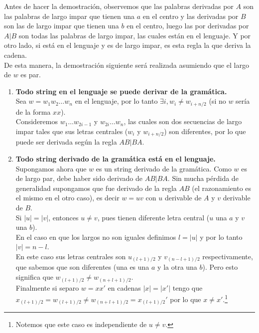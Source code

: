 \documentclass[dcc]{fcfmcourse}
\begin{document}
\begin{problems}
\begin{enumerate}[a)]
Antes de hacer la demostración, observemos que las palabras derivadas por $A$ son las palabras de largo impar que tienen una $a$ en el centro y las derivadas por $B$ son las de largo impar que tienen una $b$ en el centro, luego las por derivadas por $A|B$ son todas las palabras de largo impar, las cuales están en el lenguaje. Y por otro lado, si está en el lenguaje y es de largo impar, es esta regla la que deriva la cadena.\\
De esta manera, la demostración siguiente será realizada asumiendo que el largo de $w$ es par.\\
\begin{enumerate}[1.]
\item \textbf{Todo string en el lenguaje se puede derivar de la gramática.}\\
Sea $w = w_{1}w_{2}\ldots w_{n}$ en el lenguaje, por lo tanto $\exists i, w_{i} \not = w_{i+n/2}$ (si no $w$ sería de la forma $xx$).\\
Consideremos $w_{1}\ldots w_{2i-1}$ y $w_{2i}\ldots w_{n}$, las cuales son dos secuencias de largo impar tales que sus letras centrales ($w_{i}$ y $w_{i+n/2}$) son diferentes, por lo que puede ser derivada según la regla $AB|BA$.
\item \textbf{Todo string derivado de la gramática está en el lenguaje.}\\
Supongamos ahora que $w$ es un string derivado de la gramática. Como $w$ es de largo par, debe haber sido derivado de $AB|BA$. Sin mucha pérdida de generalidad supongamos que fue derivado de la regla $AB$ (el razonamiento es el mismo en el otro caso), es decir $w=uv$ con $u$ derivable de $A$ y $v$ derivable de $B$.\\

Si $|u|=|v|$, entonces $u \not = v$, pues tienen diferente letra central ($u$ una $a$ y $v$ una $b$).\\
En el caso en que los largos no son iguales definimos $l=|u|$ y por lo tanto $|v| = n-l$.\\
En este caso sus letras centrales son $u_{(l+1)/2}$ y $v_{(n-l+1)/2}$ respectivamente, que sabemos que son diferentes (una es una $a$ y la otra una $b$). Pero esto significa que $w_{(l+1)/2} \not = w_{(n+l+1)/2}$.\\
Finalmente si separo $w = xx'$ en cadenas $|x|=|x'|$ tengo que $x_{(l+1)/2} = w_{(l+1)/2} \not = w_{(n+l+1)/2} = x_{(l+1)/2}'$ por lo que $x \not = x'$.\footnote{Notemos que este caso es independiente de $u \not = v$.}
\end{enumerate}
\end{enumerate}
\end{problems}
\newpage
\end{document}
